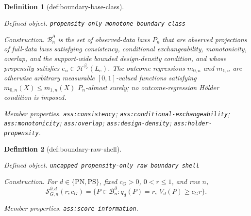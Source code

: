 \documentclass{article}
\newtheorem{definition}{Definition}
\begin{document}
\begin{definition}[def:boundary-base-class]\label{def:boundary-base-class}
\par\smallskip\noindent\emph{Defined object.} \texttt{propensity-\allowbreak{}only monotone boundary class}
\par\smallskip\noindent\emph{Construction.} \(\mathcal B_n^\partial\) is the set of observed-data laws \(P_n\) that are observed projections of full-data laws satisfying consistency, conditional exchangeability, monotonicity, overlap, and the support-wide bounded design-density condition, and whose propensity satisfies \(e_n\in\mathcal H^{\beta_e}(L_e)\). The outcome regressions \(m_{0,n}\) and \(m_{1,n}\) are otherwise arbitrary measurable \([0,1]\)-valued functions satisfying \(m_{0,n}(X)\le m_{1,n}(X)\) \(P_n\)-almost surely; no outcome-regression H\"older condition is imposed.
\par\smallskip\noindent\emph{Member properties.} \texttt{ass:\allowbreak{}consistency}; \texttt{ass:\allowbreak{}conditional-\allowbreak{}exchangeability}; \texttt{ass:\allowbreak{}monotonicity}; \texttt{ass:\allowbreak{}overlap}; \texttt{ass:\allowbreak{}design-\allowbreak{}density}; \texttt{ass:\allowbreak{}holder-\allowbreak{}propensity}.
\end{definition}

\begin{definition}[def:boundary-raw-shell]\label{def:boundary-raw-shell}
\par\smallskip\noindent\emph{Defined object.} \texttt{uncapped propensity-\allowbreak{}only raw boundary shell}
\par\smallskip\noindent\emph{Construction.} For \(d\in\{\mathrm{PN},\mathrm{PS}\}\), fixed \(c_G>0\), \(0<r\le1\), and row \(n\),
\[\mathcal S_{G,n}^{\partial,d}(r;c_G)=\{P\in\mathcal B_n^\partial:q_d(P)=r,\ V_d(P)\ge c_Gr\}.\]
\par\smallskip\noindent\emph{Member properties.} \texttt{ass:\allowbreak{}score-\allowbreak{}information}.
\end{definition}
\end{document}
